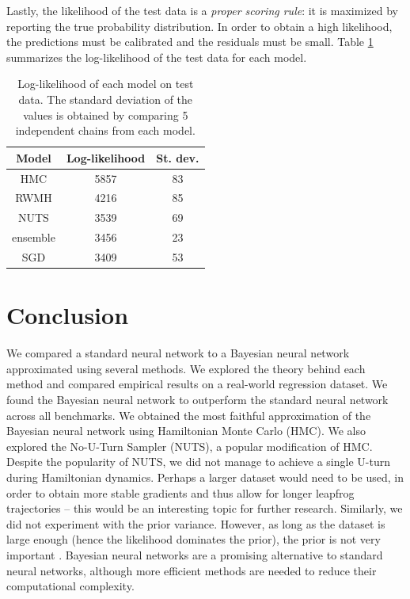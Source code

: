 \documentclass[12pt]{article}
\begin{document}
Lastly, the likelihood of the test data is a \textit{proper scoring rule}: it is maximized by reporting the true probability distribution. In order to obtain a high likelihood, the predictions must be calibrated and the residuals must be small. Table \ref{table_uci_loglike} summarizes the log-likelihood of the test data for each model. %

\begin{table}[H]
\centering
\begin{tabular}{|c|c|c|}
\hline
Model    & Log-likelihood & St. dev. \\ \hline
HMC      & 5857           & 83       \\ \hline
RWMH     & 4216           & 85       \\ \hline
NUTS     & 3539           & 69       \\ \hline
ensemble & 3456           & 23       \\ \hline
SGD      & 3409           & 53       \\ \hline
\end{tabular}
\label{table_uci_loglike}
\caption{Log-likelihood of each model on test data. The standard deviation of the values is obtained by comparing 5 independent chains from each model.}
\end{table}

\section{Conclusion}

We compared a standard neural network to a Bayesian neural network approximated using several methods. We explored the theory behind each method and compared empirical results on a real-world regression dataset. We found the Bayesian neural network to outperform the standard neural network across all benchmarks. We obtained the most faithful approximation of the Bayesian neural network using Hamiltonian Monte Carlo (HMC). We also explored the No-U-Turn Sampler (NUTS), a popular modification of HMC. Despite the popularity of NUTS, we did not manage to achieve a single U-turn during Hamiltonian dynamics. Perhaps a larger dataset would need to be used, in order to obtain more stable gradients and thus allow for longer leapfrog trajectories -- this would be an interesting topic for further research. Similarly, we did not experiment with the prior variance. However, as long as the dataset is large enough (hence the likelihood dominates the prior), the prior is not very important \cite{bnn_posterior}. Bayesian neural networks are a promising alternative to standard neural networks, although more efficient methods are needed to reduce their computational complexity.

\clearpage

\end{document}
